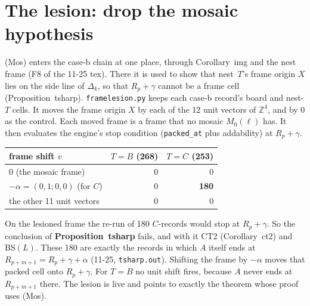 \documentclass[11pt]{article}
\theoremstyle{definition}\newtheorem{definition}[theorem]{Definition}\newtheorem{remark}[theorem]{Remark}
\newcommand{\Z}{\mathbb Z}
\begin{document}
\section{The lesion: drop the mosaic hypothesis}\label{sec:lesion}
(Mos) enters the case-b chain at one place, through Corollary~img and the nest frame (F8 of the 11-25 tex). There it is used to show that nest~$T$'s frame origin $X$ lies on the side line of $\Delta_k$, so that $R_p+\gamma$ cannot be a frame cell (Proposition~tsharp). \texttt{framelesion.py} keeps each case-b record's board and nest-$T$ cells. It moves the frame origin $X$ by each of the 12 unit vectors of $\Z^4$, and by $0$ as the control. Each moved frame is a frame that no mosaic $M_0(\ell)$ has. It then evaluates the engine's stop condition (\texttt{packed\_at} plus addability) at $R_p+\gamma$.
\begin{center}\small\begin{tabular}{lrr}\toprule
frame shift $v$ & $T=B$ (268) & $T=C$ (253)\\\midrule
$0$ (the mosaic frame) & 0 & 0\\
$-\alpha=(0,1;0,0)$ (for $C$) & 0 & \textbf{180}\\
the other 11 unit vectors & 0 & 0\\\bottomrule
\end{tabular}\end{center}
On the lesioned frame the re-run of 180 $C$-records would stop at $R_p+\gamma$. So the conclusion of \textbf{Proposition~tsharp} fails, and with it CT2 (Corollary~ct2) and BS$(L)$. These 180 are exactly the records in which $A$ itself ends at $R_{p+m+1}=R_p+\gamma+\alpha$ (11-25, \texttt{tsharp.out}). Shifting the frame by $-\alpha$ moves that packed cell onto $R_p+\gamma$. For $T=B$ no unit shift fires, because $A$ never ends at $R_{p+m+1}$ there. The lesion is live and points to exactly the theorem whose proof uses (Mos).
\end{document}
